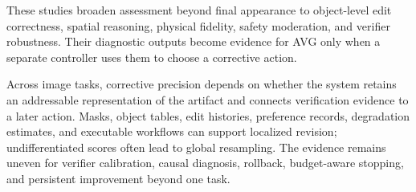 These studies broaden assessment beyond final appearance to object-level edit correctness, spatial reasoning, physical fidelity, safety moderation, and verifier robustness. Their diagnostic outputs become evidence for AVG only when a separate controller uses them to choose a corrective action.

Across image tasks, corrective precision depends on whether the system retains an addressable representation of the artifact and connects verification evidence to a later action. Masks, object tables, edit histories, preference records, degradation estimates, and executable workflows can support localized revision; undifferentiated scores often lead to global resampling. The evidence remains uneven for verifier calibration, causal diagnosis, rollback, budget-aware stopping, and persistent improvement beyond one task.

\FloatBarrier
